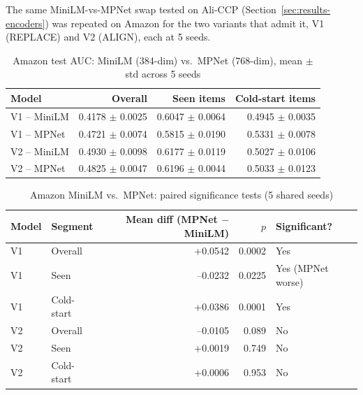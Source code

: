 The same MiniLM-vs-MPNet swap tested on Ali-CCP (Section~\ref{sec:results-encoders}) was repeated on Amazon for the two variants that admit it, V1 (REPLACE) and V2 (ALIGN), each at 5 seeds.

\begin{table}[h]
\centering
\caption{Amazon test AUC: MiniLM (384-dim) vs.\ MPNet (768-dim), mean $\pm$ std across 5 seeds}
\label{tab:amazon-mpnet-vs-minilm}
\begin{tabular}{lrrr}
\toprule
Model & Overall\footnotemark & Seen items & Cold-start items \\
\midrule
V1 -- MiniLM & 0.4178 $\pm$ 0.0025 & 0.6047 $\pm$ 0.0064 & 0.4945 $\pm$ 0.0035 \\
V1 -- MPNet  & 0.4721 $\pm$ 0.0074 & 0.5815 $\pm$ 0.0190 & 0.5331 $\pm$ 0.0078 \\
V2 -- MiniLM & 0.4930 $\pm$ 0.0098 & 0.6177 $\pm$ 0.0119 & 0.5027 $\pm$ 0.0106 \\
V2 -- MPNet  & 0.4825 $\pm$ 0.0047 & 0.6196 $\pm$ 0.0044 & 0.5033 $\pm$ 0.0123 \\
\bottomrule
\end{tabular}
\end{table}

\begin{table}[h]
\centering
\caption{Amazon MiniLM vs.\ MPNet: paired significance tests (5 shared seeds)}
\label{tab:amazon-encoder-sig}
\begin{tabular}{llrrl}
\toprule
Model & Segment & Mean diff (MPNet $-$ MiniLM) & $p$ & Significant? \\
\midrule
V1 & Overall     & +0.0542 & 0.0002 & Yes \\
V1 & Seen        & --0.0232 & 0.0225 & Yes (MPNet worse) \\
V1 & Cold-start  & +0.0386 & 0.0001 & Yes \\
V2 & Overall     & --0.0105 & 0.089 & No \\
V2 & Seen        & +0.0019 & 0.749 & No \\
V2 & Cold-start  & +0.0006 & 0.953 & No \\
\bottomrule
\end{tabular}
\end{table}

